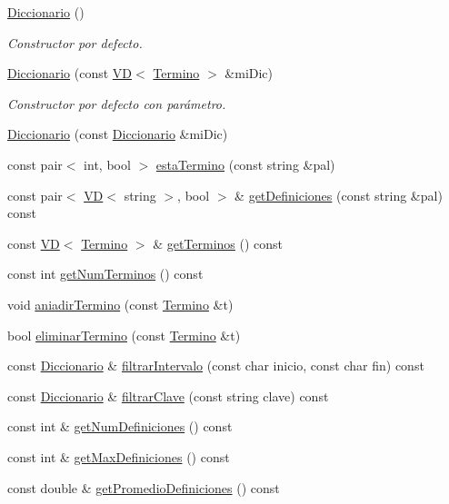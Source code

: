 \begin{DoxyCompactItemize}
\item 
\mbox{\hyperlink{class_diccionario_aa0a2191ec706b256c35b5229cc197b15}{Diccionario}} ()
\begin{DoxyCompactList}\small\item\em Constructor por defecto. \end{DoxyCompactList}\item 
\mbox{\hyperlink{class_diccionario_aef379e39fd3f807873185ada93bb35cb}{Diccionario}} (const \mbox{\hyperlink{class_v_d}{VD}}$<$ \mbox{\hyperlink{class_termino}{Termino}} $>$ \&mi\+Dic)
\begin{DoxyCompactList}\small\item\em Constructor por defecto con parámetro. \end{DoxyCompactList}\item 
\mbox{\hyperlink{class_diccionario_a19cb60001ffd8a8224fedc1449b6e09c}{Diccionario}} (const \mbox{\hyperlink{class_diccionario}{Diccionario}} \&mi\+Dic)
\item 
const pair$<$ int, bool $>$ \mbox{\hyperlink{class_diccionario_a140c6445502d5d7db7fbc050695797cc}{esta\+Termino}} (const string \&pal)
\item 
const pair$<$ \mbox{\hyperlink{class_v_d}{VD}}$<$ string $>$, bool $>$ \& \mbox{\hyperlink{class_diccionario_a3807bac7b070101ce9748c5fc61f57dc}{get\+Definiciones}} (const string \&pal) const
\item 
const \mbox{\hyperlink{class_v_d}{VD}}$<$ \mbox{\hyperlink{class_termino}{Termino}} $>$ \& \mbox{\hyperlink{class_diccionario_a5cc88c4cf7fee49b715f31bea0c2abd3}{get\+Terminos}} () const
\item 
const int \mbox{\hyperlink{class_diccionario_a79a9b966438e99fc637e62673c121c14}{get\+Num\+Terminos}} () const
\item 
void \mbox{\hyperlink{class_diccionario_ab4cc0b335a2e048fa2920186af2fe349}{aniadir\+Termino}} (const \mbox{\hyperlink{class_termino}{Termino}} \&t)
\item 
bool \mbox{\hyperlink{class_diccionario_a805922dba5d9839770140b87ca93f758}{eliminar\+Termino}} (const \mbox{\hyperlink{class_termino}{Termino}} \&t)
\item 
const \mbox{\hyperlink{class_diccionario}{Diccionario}} \& \mbox{\hyperlink{class_diccionario_ad5e4f19a59c5b60c864b197a2792c26c}{filtrar\+Intervalo}} (const char inicio, const char fin) const
\item 
const \mbox{\hyperlink{class_diccionario}{Diccionario}} \& \mbox{\hyperlink{class_diccionario_a39a999223e0da328d10e518528830327}{filtrar\+Clave}} (const string clave) const
\item 
const int \& \mbox{\hyperlink{class_diccionario_a3c5554b8ec7dd6549d9ac0844510a49f}{get\+Num\+Definiciones}} () const
\item 
const int \& \mbox{\hyperlink{class_diccionario_ac37e5510381ead2192e66848e6e5f726}{get\+Max\+Definiciones}} () const
\item 
const double \& \mbox{\hyperlink{class_diccionario_afc533a9cf6311689b2b582a07ee81434}{get\+Promedio\+Definiciones}} () const
\end{DoxyCompactItemize}
